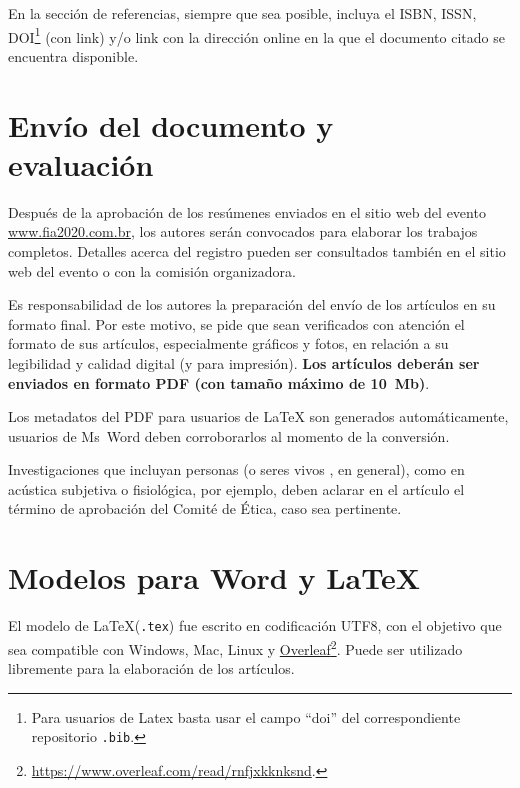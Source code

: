 \documentclass[12pt, a4paper, twoside, twocolumn]{article}
\begin{document}
En la sección de referencias, siempre que sea posible, incluya el ISBN, ISSN, DOI\footnote{Para usuarios de Latex basta usar el campo ``doi'' del correspondiente repositorio \texttt{.bib}.} (con link) y/o link con la dirección online en la que el documento citado se encuentra disponible.

\section{Envío del documento y\\ evaluación}

Después de la aprobación de los resúmenes enviados en el sitio web del evento \url{www.fia2020.com.br}, los autores serán convocados para elaborar los trabajos completos. Detalles acerca del registro pueden ser consultados también en el sitio web del evento o con la comisión organizadora.

Es responsabilidad de los autores la preparación del envío de los artículos en su formato final. Por este motivo, se pide que sean verificados con atención el formato de sus artículos, especialmente gráficos y fotos, en relación a su legibilidad y calidad digital (y para impresión). \textbf{Los artículos deberán ser enviados en formato PDF (con tamaño máximo de 10~Mb)}.

Los metadatos del PDF para usuarios de \LaTeX\xspace son generados automáticamente, usuarios de Ms~Word deben corroborarlos al momento de la conversión.

Investigaciones que incluyan personas (o seres vivos , en general), como en acústica subjetiva o fisiológica, por ejemplo, deben aclarar en el artículo el término de aprobación del Comité de Ética, caso sea pertinente.

\section{Modelos para Word y \LaTeX}

El modelo de \LaTeX\xspace (\texttt{.tex}) fue escrito en codificación UTF8, con el objetivo que sea compatible con Windows, Mac, Linux y \href{https://www.overleaf.com/read/rnfjxkknksnd}{Overleaf}\footnote{\url{https://www.overleaf.com/read/rnfjxkknksnd}.}. Puede ser utilizado libremente para la elaboración de los artículos.
\end{document}
